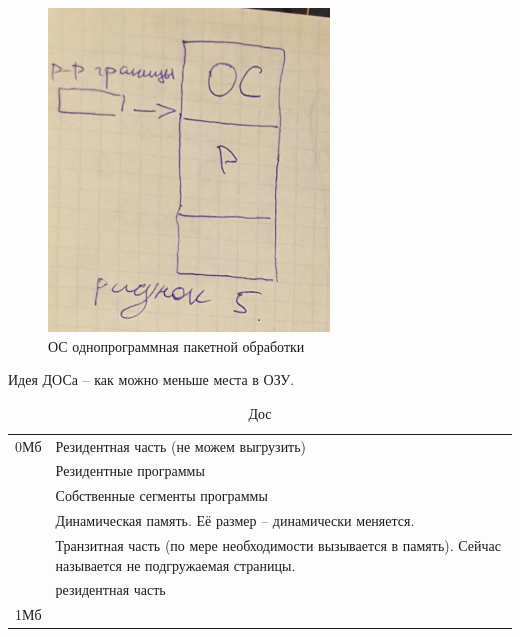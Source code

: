\begin{figure}[H]
	\centering
	\includegraphics[width=\textwidth]{pic/6.png}
	\caption{ОС однопрограммная пакетной обработки}
\end{figure}

Идея ДОСа – как можно меньше места в ОЗУ. 

\begin{table}[H]
\caption{Дос}
\begin{tabular}{|l|l|}
\hline
0Мб & Резидентная часть  (не можем выгрузить)\\
& Резидентные программы\\
& Собственные сегменты программы\\
& Динамическая память. Её размер – динамически меняется.\\
& Транзитная часть (по мере необходимости вызывается в память). Сейчас называется не подгружаемая страницы.
\\
& резидентная часть\\
1Мб & \\
\hline
\end{tabular}
\end{table}


